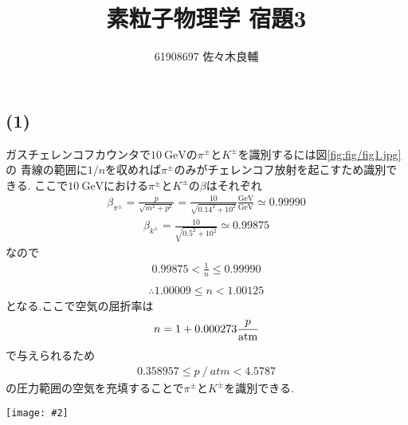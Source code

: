 \documentclass[uplatex,a4j,11pt,dvipdfmx]{jsarticle}
\makeatletter
\def\fgcaption{\def\@captype{figure}\caption}
\newcommand{\mfig}[3][width=15cm]{
\begin{center}
\texttt{[image: \#2]}
\fgcaption{#3 \label{fig:#2}}
\end{center}
}
\makeatother
\begin{document}
\title{素粒子物理学 宿題3}
\author{61908697 佐々木良輔}
\date{}
\maketitle
\subsection*{(1)}
ガスチェレンコフカウンタで$10\ \si{\giga\electronvolt}$の$\pi^\pm$と$K^\pm$を識別するには図\ref{fig:fig/fig1.jpg}の
青線の範囲に$1/n$を収めれば$\pi^\pm$のみがチェレンコフ放射を起こすため識別できる.
ここで$10\ \si{\giga\electronvolt}$における$\pi^\pm$と$K^\pm$の$\beta$はそれぞれ
\begin{align*}
  \beta_{\pi^\pm}=\frac{p}{\sqrt{m^2+p^2}}=\frac{10}{\sqrt{0.14^2+10^2}}\frac{\si{\giga\electronvolt}}{\si{\giga\electronvolt}}\simeq 0.99990
\end{align*}
\begin{align*}
  \beta_{k^\pm}=\frac{10}{\sqrt{0.5^2+10^2}}\simeq0.99875
\end{align*}
なので
\begin{align*}
  0.99875<\frac{1}{n}\leq 0.99990\\
\end{align*}
\begin{align*}
  \therefore 1.00009\leq n <1.00125
\end{align*}
となる.ここで空気の屈折率は
\begin{align*}
  n=1+0.000273\frac{p}{\rm atm}
\end{align*}
で与えられるため
\begin{align*}
  0.358957\leq p\ /\ \si{atm}<4.5787
\end{align*}
の圧力範囲の空気を充填することで$\pi^\pm$と$K^\pm$を識別できる.
\mfig[width=8cm]{fig/fig1.jpg}{$1/n$の範囲}
\end{document}
